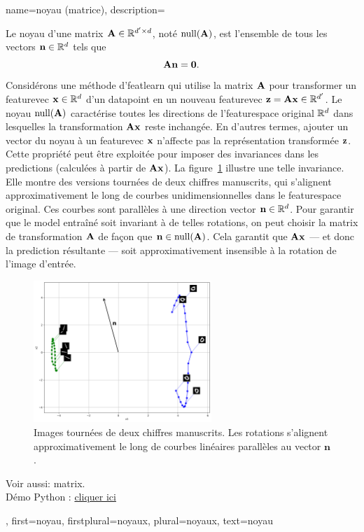 {name={noyau (matrice)},
	description={
		Le noyau d'une \gls{matrix} ${\bf A} \in \mathbb{R}^{d' \times d}$, 
		noté ${\rm null}({\bf A})$, est l'ensemble de tous les \glspl{vector} $\mathbf{n} \in \mathbb{R}^d$ 
		tels que $${\bf A} \mathbf{n} = \mathbf{0}.$$ 
		Considérons une méthode d'\gls{featlearn} qui utilise la \gls{matrix} ${\bf A}$ pour transformer 
		un \gls{featurevec} $\mathbf{x} \in \mathbb{R}^{d}$ d'un \gls{datapoint} 
		en un nouveau \gls{featurevec} ${\bf z} = {\bf A} \mathbf{x} \in \mathbb{R}^{d'}$. 
		Le noyau ${\rm null}({\bf A})$ caractérise toutes les directions de l'\gls{featurespace} 
		original $\mathbb{R}^{d}$ dans lesquelles la transformation 
		${\bf A} \mathbf{x}$ reste inchangée. En d'autres termes, ajouter un \gls{vector} du noyau 
		à un \gls{featurevec} ${\bf x}$ n'affecte pas la représentation transformée ${\bf z}$. 
		Cette propriété peut être exploitée pour imposer des invariances dans les 
		\glspl{prediction} (calculées à partir de ${\bf A} \mathbf{x}$). 
		La figure~\ref{fig:nullspace-rotation-dict} illustre une telle invariance. 
		Elle montre des versions tournées de deux chiffres manuscrits, 
		qui s’alignent approximativement le long de courbes unidimensionnelles dans le \gls{featurespace} 
		original. Ces courbes sont parallèles à une direction \gls{vector} $\mathbf{n} \in \mathbb{R}^{d}$. 
		Pour garantir que le \gls{model} entraîné soit invariant à de telles rotations, 
		on peut choisir la \gls{matrix} de transformation ${\bf A}$ de façon que $\mathbf{n} \in {\rm null}({\bf A})$. 
		Cela garantit que ${\bf A} \mathbf{x}$ — et donc la \gls{prediction} résultante — 
		soit approximativement insensible à la rotation de l’image d’entrée.
		\begin{figure}[h]
			\centering
			\includegraphics[width=0.6\textwidth]{../../assets/pythonsnacks/nullspace_0_1.png}
			\caption{Images tournées de deux chiffres manuscrits. Les rotations s’alignent approximativement 
				le long de courbes linéaires parallèles au \gls{vector} $\mathbf{n}$.\label{fig:nullspace-rotation-dict}}	
		\end{figure}
		Voir aussi: \gls{matrix}. \\ 
		Démo Python : \href{https://github.com/AaltoDictionaryofML/AaltoDictionaryofML.github.io/blob/main/assets/pythonsnacks/nullspace.py}{cliquer ici}},
	first={noyau},
	firstplural={noyaux},
	plural={noyaux},
	text={noyau}
}

